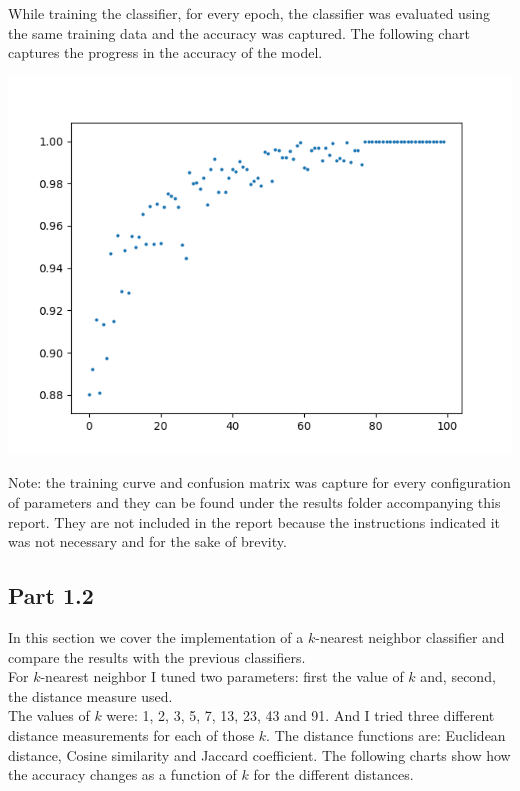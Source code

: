 \documentclass[11pt]{article}
\begin{document}
While training the classifier, for every epoch, the classifier was evaluated using the same training data and the accuracy was captured. The following chart captures the progress in the accuracy of the model.

\begin{center}
\includegraphics[scale=0.75]{part1.1/trainingcurve/setup4.png}
\end{center}

Note: the training curve and confusion matrix was capture for every configuration of parameters and they can be found under the results folder accompanying this report. They are not included in the report because the instructions indicated it was not necessary and for the sake of brevity.

\subsection*{Part 1.2}

In this section we cover the implementation of a $k$-nearest neighbor classifier and compare the results with the previous classifiers.\\

For $k$-nearest neighbor I tuned two parameters: first the value of $k$ and, second, the distance measure used.\\

The values of $k$ were: 1, 2, 3, 5, 7, 13, 23, 43 and 91. And I tried three different distance measurements for each of those $k$. The distance functions are: Euclidean distance, Cosine similarity and Jaccard coefficient. The following charts show how the accuracy changes as a function of $k$ for the different distances.
\end{document}
